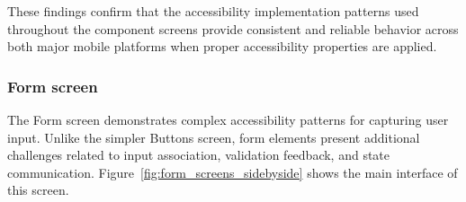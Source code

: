 These findings confirm that the accessibility implementation patterns used throughout the component screens provide consistent and reliable behavior across both major mobile platforms when proper accessibility properties are applied.

\subsubsection{Form screen}
\label{subsubsec:forms-screen}

The Form screen demonstrates complex accessibility patterns for capturing user input. Unlike the simpler Buttons screen, form elements present additional challenges related to input association, validation feedback, and state communication. Figure~\ref{fig:form_screens_sidebyside} shows the main interface of this screen.

